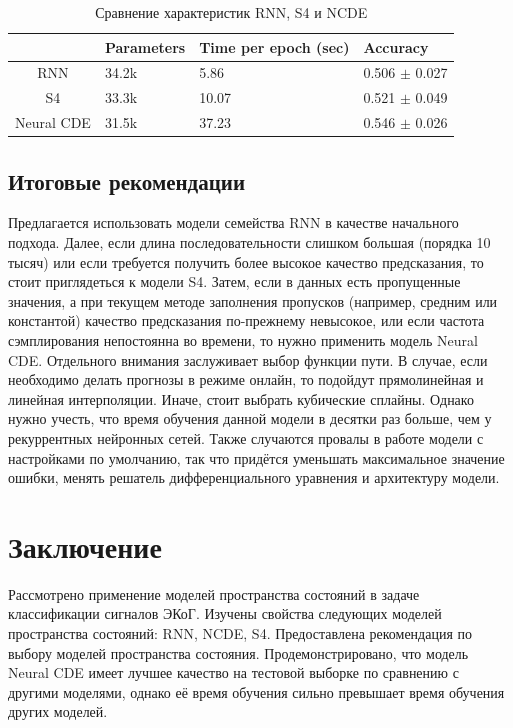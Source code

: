 \documentclass[a4paper, 12pt]{article}
\begin{document}
	\begin{table}[bhtp]
		\centering
		\caption{Сравнение характеристик RNN, S4 и NCDE}
		\label{tbl:rnn-s4-ncde}
		\begin{tabular}{c|l|l|l|}
			\cline{2-4}
			\multicolumn{1}{l|}{}  & Parameters & Time per epoch (sec) & Accuracy \\ \hline
			\multicolumn{1}{|c|}{RNN} & 34.2k & 5.86 & 0.506 $\pm$ 0.027 \\ \hline
			\multicolumn{1}{|c|}{S4} & 33.3k & 10.07 & 0.521 $\pm$ 0.049 \\ \hline
			\multicolumn{1}{|c|}{Neural CDE} & 31.5k & 37.23 & 0.546 $\pm$ 0.026 \\ \hline
		\end{tabular}
	\end{table}
	
	\subsection{Итоговые рекомендации}
	Предлагается использовать модели семейства RNN в качестве начального подхода. Далее, если длина последовательности слишком большая (порядка 10 тысяч) или если требуется получить более высокое качество предсказания, то стоит приглядеться к модели S4. Затем, если в данных есть пропущенные значения, а при текущем методе заполнения пропусков (например, средним или константой) качество предсказания по-прежнему невысокое, или если частота сэмплирования непостоянна во времени, то нужно применить модель Neural CDE. Отдельного внимания заслуживает выбор функции пути. В случае, если необходимо делать прогнозы в режиме онлайн, то подойдут прямолинейная и линейная интерполяции. Иначе, стоит выбрать кубические сплайны. Однако нужно учесть, что время обучения данной модели в десятки раз больше, чем у рекуррентных нейронных сетей. Также случаются провалы в работе модели с настройками по умолчанию, так что придётся уменьшать максимальное значение ошибки, менять решатель дифференциального уравнения и архитектуру модели.
	
	\section{Заключение}
	Рассмотрено применение моделей пространства состояний в задаче классификации сигналов ЭКоГ.
	Изучены свойства следующих моделей пространства состояний: RNN, NCDE, S4.
	Предоставлена рекомендация по выбору моделей пространства состояния.
	Продемонстрировано, что модель Neural CDE имеет лучшее качество на тестовой выборке по сравнению с другими моделями, однако её время обучения сильно превышает время обучения других моделей.
	
	
	
	
\end{document}
